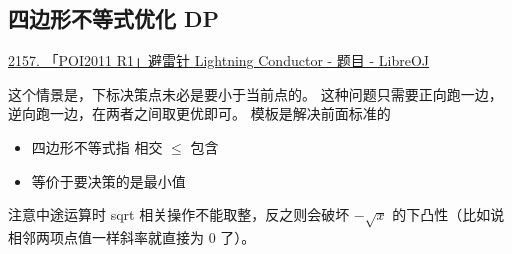 \subsection{四边形不等式优化 DP}

\href{https://loj.ac/p/2157}{2157. 「POI2011 R1」避雷针 Lightning Conductor - 题目 - LibreOJ}

这个情景是，下标决策点未必是要小于当前点的。
这种问题只需要正向跑一边，逆向跑一边，在两者之间取更优即可。
模板是解决前面标准的
\begin{itemize}
    \item 四边形不等式指 相交 $\le$ 包含
    \item 等价于要决策的是最小值
\end{itemize}

注意中途运算时 sqrt 相关操作不能取整，反之则会破坏 $-\sqrt{x}$ 的下凸性（比如说相邻两项点值一样斜率就直接为 0 了）。

